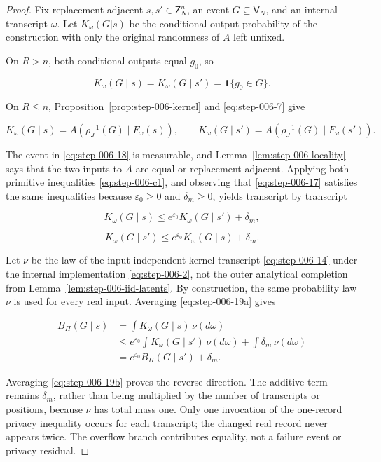 \begin{proof}

Fix replacement-adjacent \(s,s'\in\mathsf Z_N^n\), an event \(G\subseteq\mathsf V_N\), and an internal transcript \(\omega\). Let \(K_\omega(G|s)\) be the conditional output probability of the construction with only the original randomness of \(A\) left unfixed.

On \(R>n\), both conditional outputs equal \(g_0\), so

\[
K_\omega(G\mid s)=K_\omega(G\mid s')
=\mathbf 1\{g_0\in G\}.
\tag{17}\label{eq:step-006-17}
\]

On \(R\le n\), Proposition~\ref{prop:step-006-kernel} and \eqref{eq:step-006-7} give

\[
K_\omega(G\mid s)
=A(\rho_J^{-1}(G)\mid F_\omega(s)),
\qquad
K_\omega(G\mid s')
=A(\rho_J^{-1}(G)\mid F_\omega(s')).
\tag{18}\label{eq:step-006-18}
\]

The event in \eqref{eq:step-006-18} is measurable, and Lemma~\ref{lem:step-006-locality} says that the two inputs to \(A\) are equal or replacement-adjacent. Applying both primitive inequalities \eqref{eq:step-006-c1}, and observing that \eqref{eq:step-006-17} satisfies the same inequalities because \(\varepsilon_0\ge 0\) and \(\delta_m\ge 0\), yields transcript by transcript

\[
K_\omega(G\mid s)
\le e^{\varepsilon_0}K_\omega(G\mid s')+\delta_m,
\tag{19a}\label{eq:step-006-19a}
\]

\[
K_\omega(G\mid s')
\le e^{\varepsilon_0}K_\omega(G\mid s)+\delta_m.
\tag{19b}\label{eq:step-006-19b}
\]

Let \(\nu\) be the law of the input-independent kernel transcript \eqref{eq:step-006-14} under the internal implementation \eqref{eq:step-006-2}, not the outer analytical completion from Lemma~\ref{lem:step-006-iid-latents}. By construction, the same probability law \(\nu\) is used for every real input. Averaging \eqref{eq:step-006-19a} gives

\[
\begin{aligned}
B_\Pi(G\mid s)
&=\int K_\omega(G\mid s)\,\nu(d\omega)\\
&\le
e^{\varepsilon_0}\int K_\omega(G\mid s')\,\nu(d\omega)
+\int\delta_m\,\nu(d\omega)\\
&=e^{\varepsilon_0}B_\Pi(G\mid s')+\delta_m.
\end{aligned}
\tag{20}\label{eq:step-006-20}
\]

Averaging \eqref{eq:step-006-19b} proves the reverse direction. The additive term remains \(\delta_m\), rather than being multiplied by the number of transcripts or positions, because \(\nu\) has total mass one. Only one invocation of the one-record privacy inequality occurs for each transcript; the changed real record never appears twice. The overflow branch contributes equality, not a failure event or privacy residual.


\end{proof}
